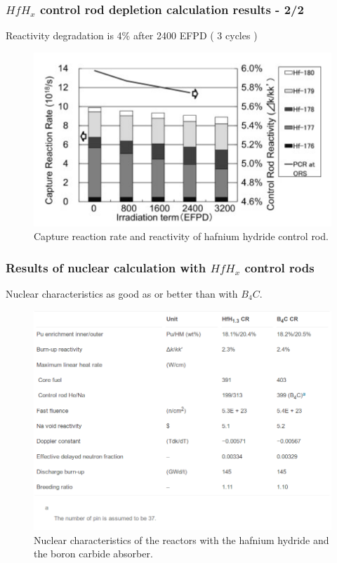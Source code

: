 \documentclass[9pt]{beamer}
\newcommand{\hfh}{$HfH_{x}$\xspace}
\newcommand{\bc}{$B_4C$\xspace}
\begin{document}
\begin{frame}
\frametitle{\hfh control rod depletion calculation results - 2/2}
Reactivity degradation is 4\% after 2400 \gls{EFPD} ( 3 cycles )
\begin{figure}[htbp!]
  \begin{center}
      \includegraphics[scale=0.4]{./images/irrad_reac.png}
  \end{center}
  \caption{Capture reaction rate and reactivity of hafnium hydride control rod.}
  \label{fig:irrad_reac}
\end{figure}
\end{frame}

\begin{frame}
\frametitle{Results of nuclear calculation with \hfh control rods}
Nuclear characteristics as good as or better than with \bc.
\begin{figure}[htbp!]
  \begin{center}
      \includegraphics[scale=0.25]{./images/reac.png}
  \end{center}
  \caption{Nuclear characteristics of the reactors with the hafnium hydride and the boron carbide absorber.}
  \label{fig:reac}
\end{figure}
\end{frame}
\end{document}
